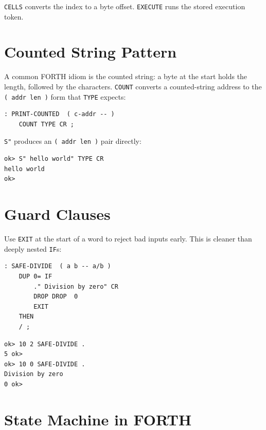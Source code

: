 \texttt{CELLS} converts the index to a byte offset. \texttt{EXECUTE} runs the
stored execution token.

\section{Counted String Pattern}
\label{sec:pattern-counted-string}

A common FORTH idiom is the counted string: a byte at the start holds the
length, followed by the characters. \texttt{COUNT} converts a counted-string
address to the \texttt{( addr len )} form that \texttt{TYPE} expects:

\begin{lstlisting}[language=Forth]
: PRINT-COUNTED  ( c-addr -- )
    COUNT TYPE CR ;
\end{lstlisting}

\texttt{S"} produces an \texttt{( addr len )} pair directly:

\begin{lstlisting}[language=Forth]
ok> S" hello world" TYPE CR
hello world
ok>
\end{lstlisting}

\section{Guard Clauses}
\label{sec:pattern-guard}

Use \texttt{EXIT} at the start of a word to reject bad inputs early. This is
cleaner than deeply nested \texttt{IF}s:

\begin{lstlisting}[language=Forth]
: SAFE-DIVIDE  ( a b -- a/b )
    DUP 0= IF
        ." Division by zero" CR
        DROP DROP  0
        EXIT
    THEN
    / ;
\end{lstlisting}

\begin{lstlisting}[language=Forth]
ok> 10 2 SAFE-DIVIDE .
5 ok>
ok> 10 0 SAFE-DIVIDE .
Division by zero
0 ok>
\end{lstlisting}

\section{State Machine in FORTH}
\label{sec:pattern-state-machine}

